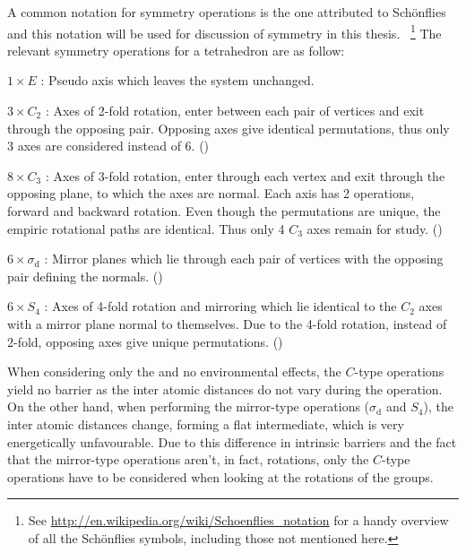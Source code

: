 A common notation for symmetry operations is the one attributed to Sch\"onflies~\cite{schonflies-notation-1889} and this notation will be used for discussion of symmetry in this thesis.
~\footnote{See \url{http://en.wikipedia.org/wiki/Schoenflies_notation} for a handy overview of all the Sch\"onflies symbols, including those not mentioned here.}
The relevant symmetry operations for a tetrahedron are as follow:
\bit
\item $1 \times E$ : Pseudo axis which leaves the system unchanged.
\item $3 \times C_2$ : Axes of 2-fold rotation, enter between each pair of vertices and exit through the opposing pair.
Opposing axes give identical permutations, thus only 3 axes are considered instead of 6.
()
\item $8 \times C_3$ : Axes of 3-fold rotation, enter through each vertex and exit through the opposing plane, to which the axes are normal. Each axis has 2 operations, forward and backward rotation.
Even though the permutations are unique, the empiric rotational paths are identical.
Thus only 4 $C_3$ axes remain for study.
()
\item $6 \times \sigma_\text{d}$ : Mirror planes which lie through each pair of vertices with the opposing pair defining the normals.
()
\item $6 \times S_4$ : Axes of 4-fold rotation and mirroring which lie identical to the $C_2$ axes with a mirror plane normal to themselves. Due to the 4-fold rotation, instead of 2-fold, opposing axes give unique permutations.
()
\eit

When considering only the  and no environmental effects, the $C$-type operations yield no barrier as the inter atomic distances do not vary during the operation.
On the other hand, when performing the mirror-type operations ($\sigma_\text{d}$ and $S_4$), the inter atomic distances change, forming a flat  intermediate, which is very energetically unfavourable.
Due to this difference in intrinsic barriers and the fact that the mirror-type operations aren't, in fact, rotations, only the $C$-type operations have to be considered when looking at the rotations of the  groups.
